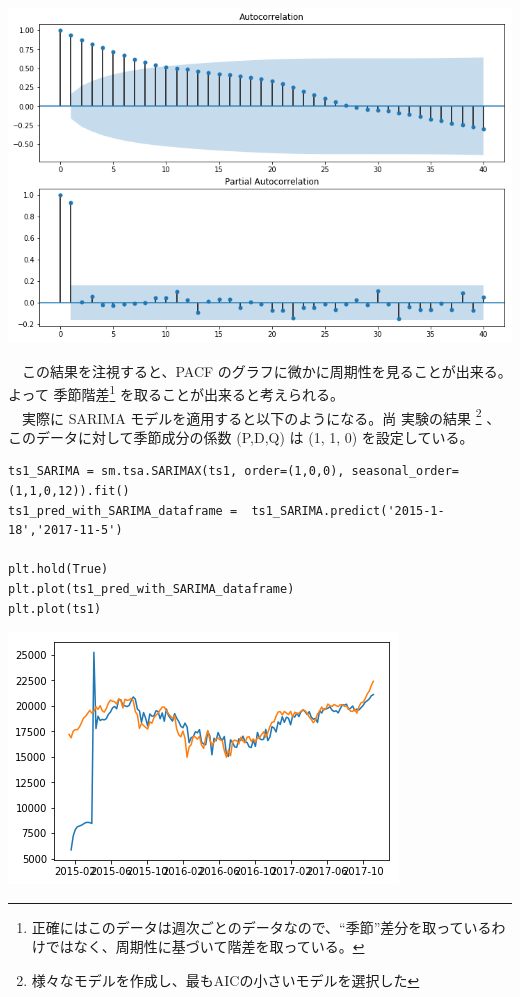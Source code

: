 \documentclass{scrartcl}
\begin{document}
\begin{center}
\includegraphics[width=.9\linewidth]{./obipy-resources/xBGhjB.png}
\end{center}

　この結果を注視すると、PACF のグラフに微かに周期性を見ることが出来る。よって 季節階差\footnote{正確にはこのデータは週次ごとのデータなので、``季節''差分を取っているわけではなく、周期性に基づいて階差を取っている。} を取ることが出来ると考えられる。\\
　実際に SARIMA モデルを適用すると以下のようになる。尚 実験の結果 \footnote{様々なモデルを作成し、最もAICの小さいモデルを選択した} 、このデータに対して季節成分の係数 (P,D,Q) は (1, 1, 0) を設定している。\\
\begin{verbatim}
ts1_SARIMA = sm.tsa.SARIMAX(ts1, order=(1,0,0), seasonal_order=(1,1,0,12)).fit()
ts1_pred_with_SARIMA_dataframe =  ts1_SARIMA.predict('2015-1-18','2017-11-5')

plt.hold(True)
plt.plot(ts1_pred_with_SARIMA_dataframe)
plt.plot(ts1)
\end{verbatim}

\begin{center}
\includegraphics[width=.9\linewidth]{./obipy-resources/FRNY3r.png}
\end{center}
\end{document}
